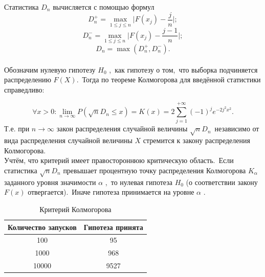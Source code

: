 \documentclass[11pt]{article}
\begin{document}
	Статистика {$D_n$} вычисляется с помощью формул
	$$D_n^+ = \max\limits_{1\leqslant j \leqslant n} \big\rvert F(x_j) - \frac{j}{n}\big\lvert;$$
	$$D_n^- = \max\limits_{1\leqslant j \leqslant n} \big\rvert F(x_j) - \frac{j - 1}{n}\big\lvert;$$
	$$D_n = \max(D_n^+,D_n^-).$$
	\\
	\indent Обозначим нулевую гипотезу {$ H_{0} $} ,\ как гипотезу о том,\ что выборка подчиняется распределению {$ F(X)$}.\ Тогда по теореме Колмогорова для введённой статистики справедливо:
	
	$$ \forall x>0\colon \lim _{n\to \infty }P({\sqrt {n}}D_{n}\leqslant x)=K(x)=2\sum _{j=1 }^{+\infty }(-1)^{j}e^{-2j^{2}x^{2}}.$$ 
	Т.е. при {$n\longrightarrow \infty $} закон распределения случайной величины {$\sqrt{n}D_n$}\ независимо от вида  распределения случайной величины {$X$} стремится к закону распределения Колмогорова.\\
	Учтём, что критерий имеет правостороннюю критическую область.\ Если статистика {$ {\sqrt {n}}D_{n}$}  превышает процентную точку распределения Колмогорова {$ K_{\alpha }$}  заданного уровня значимости {$ \alpha $} ,\ то нулевая гипотеза {$H_{0}$}  (о соответствии закону {$ F(x)$} отвергается).\ Иначе гипотеза принимается на уровне {$\alpha $} .	
	\begin{table}[h]	
		\begin{center}
			\begin{tabular}[c]{ | c | c | }
				\hline
				Количество запусков & Гипотеза принята \\ \hline
				100 & 95  \\
				1000 & 968   \\
				10000 & 9527  \\
				\hline
				
			\end{tabular}
		\end{center}
		\caption{\label{tab:canonsummary}Критерий Колмогорова}
	\end{table}
	
	
	
\end{document}
